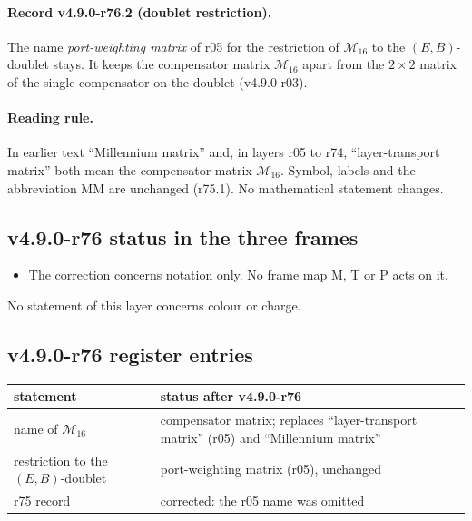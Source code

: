 \paragraph{Record v4.9.0-r76.2 (doublet restriction).}
The name \emph{port-weighting matrix} of r05 for the restriction of \(\mathcal M_{16}\) to the \((E,B)\)-doublet stays.  It
keeps the compensator matrix \(\mathcal M_{16}\) apart from the \(2\times2\) matrix of the single compensator on the doublet
(v4.9.0-r03).

\paragraph{Reading rule.}
In earlier text ``Millennium matrix'' and, in layers r05 to r74, ``layer-transport matrix'' both mean the compensator matrix
\(\mathcal M_{16}\).  Symbol, labels and the abbreviation MM are unchanged (r75.1).  No mathematical statement changes.

\subsection*{v4.9.0-r76 status in the three frames}
\label{subsec:v490-r76-frames}

\begin{itemize}[leftmargin=2em]
\item The correction concerns notation only.  No frame map M, T or P acts on it.
\end{itemize}
No statement of this layer concerns colour or charge.

\subsection*{v4.9.0-r76 register entries}
\label{subsec:v490-r76-register}

\begin{center}
\small
\begin{tabular}{@{}>{\raggedright\arraybackslash}p{}>{\raggedright\arraybackslash}p{}@{}}
\toprule
statement & status after v4.9.0-r76\\
\midrule
name of \(\mathcal M_{16}\) & compensator matrix; replaces ``layer-transport matrix'' (r05) and ``Millennium matrix''\\
restriction to the \((E,B)\)-doublet & port-weighting matrix (r05), unchanged\\
r75 record & corrected: the r05 name was omitted\\
\bottomrule
\end{tabular}
\end{center}

